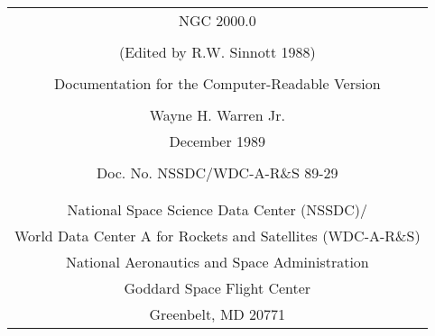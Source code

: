 %
%
%
%
\newcommand{\dmv}{Documentation for the Machine-Readable Version of}
\newcommand{\cat}{NGC 2000.0}
\newcommand{\abbr}{7118}
\newcommand{\prefp}{Sinnott 1988}
\newcommand{\adc}{Astronomical Data Center}
\newcommand{\docnum}{NSSDC/WDC-A-R\&S 89-29}
%

%
\setcounter{page}{0}
\thispagestyle{empty}
\null \vfil \vskip 1in
\begin{center}
\begin{tabular}{c}
      {\LARGE \cat} \\
      \\
      {\Large (Edited by R.W. Sinnott 1988)} \\
      \\
      Documentation for the Computer-Readable Version \\
      \\
      Wayne H. Warren Jr. \\
      December 1989 \\
      \\
      {\small Doc. No. \docnum} \\
      \\
      \\
      {\small National Space Science Data Center (NSSDC)/} \\
      {\small World Data Center A for Rockets and Satellites (WDC-A-R\&S)} \\
      {\small National Aeronautics and Space Administration} \\
      {\small Goddard Space Flight Center} \\
      {\small Greenbelt, MD 20771}
\end{tabular}
\end{center}
\vfil \null
\pagebreak

\begin{abstract}

The machine-readable version of the catalog, as it is currently being
distributed from the \adc, is described. {\em \cat} is a modern version of the
NGC and IC catalogs compiled by J. L. E. Dreyer in the late nineteenth and early
twentieth centuries. Errata compiled by Dreyer and by subsequent workers have
been incorporated into the new version and the object types have been updated
with information from modern astronomy; the descriptions given are those of
Dreyer. The order of the new catalog is strictly by right ascension, the NGC and
IC objects being merged into one machine-readable file.

\end{abstract}

